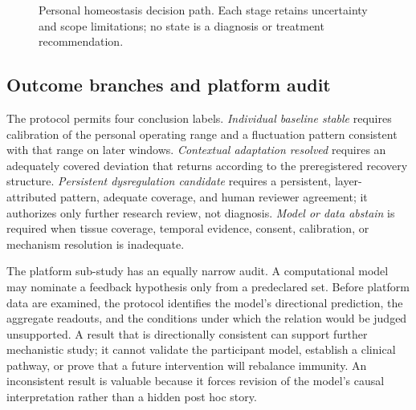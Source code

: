 \documentclass[conference]{IEEEtran}
\begin{document}
\begin{figure}[t]
\centering
{}
\caption{Personal homeostasis decision path. Each stage retains uncertainty and scope limitations; no state is a diagnosis or treatment recommendation.}
\label{fig:decisionpath}
\end{figure}

\subsection{Outcome branches and platform audit}

The protocol permits four conclusion labels. \emph{Individual baseline stable} requires calibration of the personal operating range and a fluctuation pattern consistent with that range on later windows. \emph{Contextual adaptation resolved} requires an adequately covered deviation that returns according to the preregistered recovery structure. \emph{Persistent dysregulation candidate} requires a persistent, layer-attributed pattern, adequate coverage, and human reviewer agreement; it authorizes only further research review, not diagnosis. \emph{Model or data abstain} is required when tissue coverage, temporal evidence, consent, calibration, or mechanism resolution is inadequate.

The platform sub-study has an equally narrow audit. A computational model may nominate a feedback hypothesis only from a predeclared set. Before platform data are examined, the protocol identifies the model's directional prediction, the aggregate readouts, and the conditions under which the relation would be judged unsupported. A result that is directionally consistent can support further mechanistic study; it cannot validate the participant model, establish a clinical pathway, or prove that a future intervention will rebalance immunity. An inconsistent result is valuable because it forces revision of the model's causal interpretation rather than a hidden post hoc story.
\end{document}
